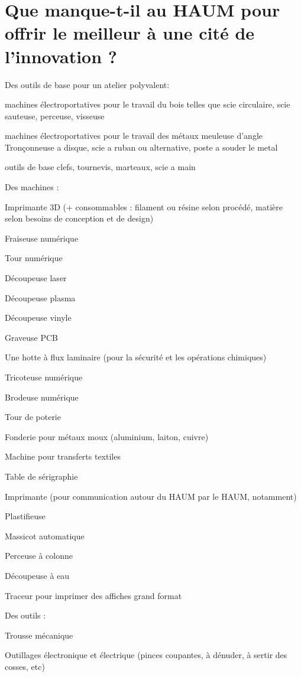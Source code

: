 \documentclass[a4paper,10pt]{scrartcl}
\begin{document}
\section{Que manque-t-il au HAUM pour offrir le meilleur à une cité de l'innovation ?}

Des outils de base pour un atelier polyvalent:

    machines électroportatives pour le travail du bois telles que scie circulaire, scie sauteuse, perceuse, visseuse 

    machines électroportatives pour le travail des métaux meuleuse d'angle Tronçonneuse a disque, scie a ruban ou alternative, poste a souder le metal

    outils de base clefs, tournevis, marteaux, scie a main

 
Des machines :

    Imprimante 3D (+ consommables : filament ou résine selon procédé, matière selon besoins de conception et de design)

    Fraiseuse numérique

    Tour numérique

    Découpeuse laser

    Découpeuse plasma

    Découpeuse vinyle


    Graveuse PCB

    Une hotte à flux laminaire (pour la sécurité et les opérations chimiques)


    Tricoteuse numérique

    Brodeuse numérique


    Tour de poterie

    Fonderie pour métaux moux (aluminium, laiton, cuivre)

    Machine pour transferts textiles

    Table de sérigraphie


    Imprimante (pour communication autour du HAUM par le HAUM, notamment)

    Plastifieuse

    Massicot automatique

    Perceuse à colonne

    Découpeuse à eau 

    Traceur pour imprimer des affiches grand format


Des outils :

    Trousse mécanique

    Outillages électronique et électrique (pinces coupantes, à dénuder, à sertir des cosses, etc)
\end{document}
